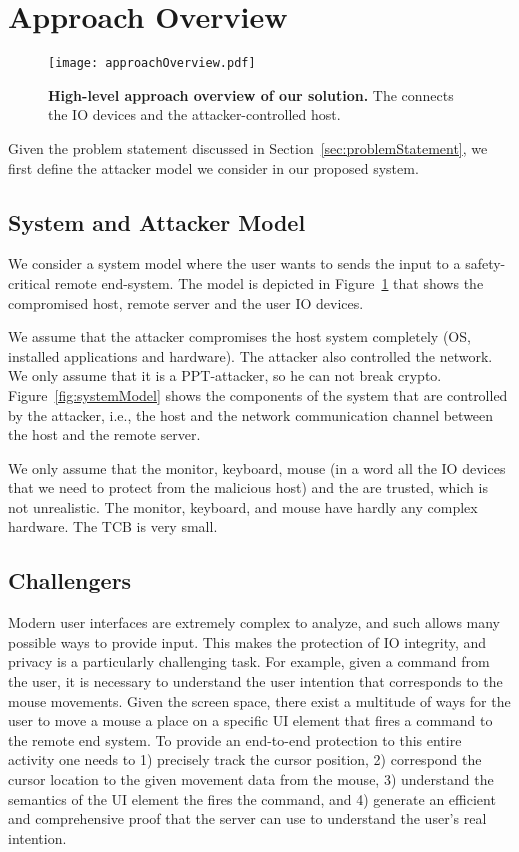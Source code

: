 \section{Approach Overview}
\label{sec:approach}


\begin{figure}[t]
\centering
\texttt{[image: approachOverview.pdf]}
\caption{\textbf{High-level approach overview of our solution.}  The \device connects the IO devices and the attacker-controlled host. }
\label{fig:approachOverview}
\centering
\end{figure}

Given the problem statement discussed in Section~\ref{sec:problemStatement}, we first define the attacker model we consider in our proposed system.


\subsection{System and Attacker Model}

We consider a system model where the user wants to sends the input to a safety-critical remote end-system. The model is depicted in Figure~\ref{fig:approachOverview} that shows the compromised host, remote server and the user IO devices. 

We assume that the attacker compromises the host system completely (OS, installed applications and hardware). The attacker also controlled the network. We only assume that it is a PPT-attacker, so he can not break crypto. Figure~\ref{fig:systemModel} shows the components of the system that are controlled by the attacker, i.e., the host and the network communication channel between the host and the remote server.

We only assume that the monitor, keyboard, mouse (in a word all the IO devices that we need to protect from the malicious host) and the \device are trusted, which is not unrealistic. The monitor, keyboard, and mouse have hardly any complex hardware. The TCB is very small.

\subsection{Challengers}

Modern user interfaces are extremely complex to analyze, and such allows many possible ways to provide input. This makes the protection of IO integrity, and privacy is a particularly challenging task. For example, given a command from the user, it is necessary to understand the user intention that corresponds to the mouse movements. Given the screen space, there exist a multitude of ways for the user to move a mouse a place on a specific UI element that fires a command to the remote end system. To provide an end-to-end protection to this entire activity one needs to 1) precisely track the cursor position, 2) correspond the cursor location to the given movement data from the mouse, 3) understand the semantics of the UI element the fires the command, and 4) generate an efficient and comprehensive proof that the server can use to understand the user's real intention.


